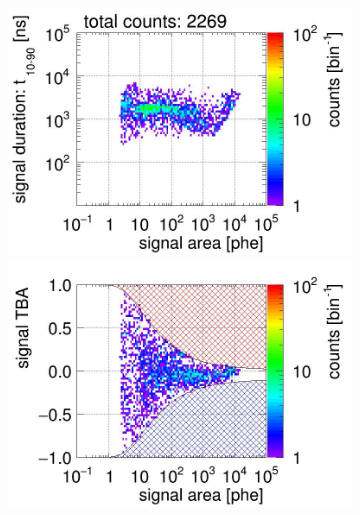 \begin{landscape}
\begin{figure}[!p]
\begin{subfigure}[t]{0.32\textwidth}
			\caption{}
			\label{fig:signal selection 08}
		\end{subfigure}
		\begin{subfigure}[t]{0.32\textwidth}
			\centering
			\includegraphics[width=\figurewidth,clip,trim={0 98 0 15}]{Figures/GasTest/CutsValid/res64767/pdpa09Vecfig64767.jpg}
			\includegraphics[width=\figurewidth,clip,trim={0 98 0 40}]{Figures/GasTest/CutsValid/res64767/tbapa09Vecfig64767.jpg}

\end{subfigure}
\end{figure}
\end{landscape}
